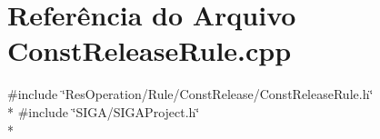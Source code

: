 \section{Referência do Arquivo Const\+Release\+Rule.\+cpp}
\label{_rule_2_const_release_2_const_release_rule_8cpp}
{\ttfamily \#include \char`\"{}Res\+Operation/\+Rule/\+Const\+Release/\+Const\+Release\+Rule.\+h\char`\"{}}\\*
{\ttfamily \#include \char`\"{}S\+I\+G\+A/\+S\+I\+G\+A\+Project.\+h\char`\"{}}\\*
